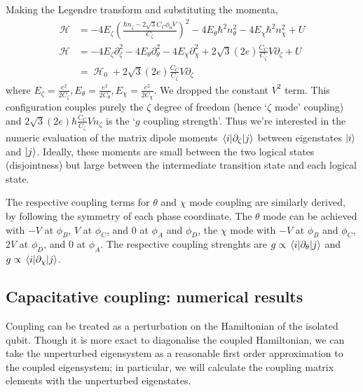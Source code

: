 \documentclass[11pt]{article}
\DeclareMathOperator{\ham}{\mathcal{H}}
\begin{document}
Making the Legendre transform and substituting the momenta,
\begin{align}
\ham 
&= - 4 E_\zeta \left(\frac{\hbar n_\zeta - 2 \sqrt{3} C_C \phi_0 V}{C_\zeta}\right)^2 - 4 E_\theta \hbar^2 n_\theta^2  - 4 E_\chi \hbar^2 n_\chi^2 + U \\
\ham 
&= - 4 E_\zeta \partial_\zeta^2 - 4 E_\theta \partial_\theta^2  - 4 E_\chi \partial_\chi^2 + 2 \sqrt{3} (2e) \frac{C_C}{C_\zeta} V \partial_\zeta + U \\
&= \ham_0 + 2 \sqrt{3} (2e) \frac{C_C}{C_\zeta} V \partial_\zeta
\end{align}   
where $E_\zeta = \frac{e^2}{2C_\zeta}, E_\theta = \frac{e^2}{2C_\theta}, E_\chi = \frac{e^2}{2C_\chi}$. We dropped the constant $V^2$ term. This configuration couples purely the $\zeta$ degree of freedom (hence `$\zeta$ mode' coupling) and $2 \sqrt{3} (2e) \hbar \frac{C_C}{C_\zeta} V n_\zeta$ is the `$g$ coupling strength'. Thus we're interested in the numeric evaluation of the matrix dipole moments $\matrixel{i}{\partial_\zeta}{j}$ between eigenstates $\ket{i}$ and $\ket{j}$. Ideally, these moments are small between the two logical states (disjointness) but large between the intermediate transition state and each logical state.

The respective coupling terms for $\theta$ and $\chi$ mode coupling are similarly derived, by following the symmetry of each phase coordinate. The $\theta$ mode can be achieved with $-V$ at $\phi_B$, $V$ at $\phi_C$, and $0$ at $\phi_A$ and $\phi_D$, the $\chi$ mode with $-V$ at $\phi_B$ and $\phi_C$, $2V$ at $\phi_D$, and $0$ at $\phi_A$. The respective coupling strenghts are $g \propto \matrixel{i}{\partial_\theta}{j}$ and $g \propto \matrixel{i}{\partial_\chi}{j}$. 




\subsection{Capacitative coupling: numerical results}

Coupling can be treated as a perturbation on the Hamiltonian of the isolated qubit. Though it is more exact to diagonalise the coupled Hamiltonian, we can take the unperturbed eigensystem as a reasonable first order approximation to the coupled eigensystem; in particular, we will calculate the coupling matrix elements with the unperturbed eigenstates. 
\end{document}
